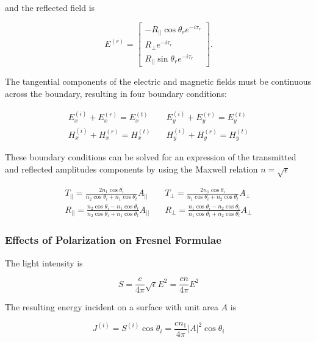 and the reflected field is

\begin{equation}
    E^{(r)} = 
    \begin{bmatrix}
        -R_{||} \cos{\theta_r} e^{-i \tau_r} \\
        R_\perp e^{-i \tau_r} \\
        R_{||} \sin{\theta_r} e^{-i \tau_r}
    \end{bmatrix}.
\end{equation}

The tangential components of the electric and magnetic fields must be continuous across the boundary, resulting in four boundary conditions:

\begin{align}
    E^{(i)}_x + E^{(r)}_x = E^{(t)}_x \quad & E^{(i)}_y + E^{(r)}_y = E^{(t)}_y \\
    H^{(i)}_x + H^{(r)}_x = H^{(t)}_x \quad & H^{(i)}_y + H^{(r)}_y = H^{(t)}_y
\end{align}

These boundary conditions can be solved for an expression of the transmitted and reflected amplitudes components by using the Maxwell relation $n = \sqrt{\epsilon}$

\begin{align}
    T_{||} = \frac{2 n_1 \cos{\theta_i}}{n_2 \cos{\theta_i} + n_1 \cos{\theta_t}} A_{||} \quad &
    T_{\perp} = \frac{2 n_1 \cos{\theta_i}}{n_1 \cos{\theta_i} + n_2 \cos{\theta_t}} A_{\perp} \\
    R_{||} = \frac{n_2 \cos{\theta_i} - n_1 \cos{\theta_t}}{n_2 \cos{\theta_i} + n_1 \cos{\theta_t}} A_{||} \quad &
    R_{\perp} = \frac{n_1 \cos{\theta_i} - n_2 \cos{\theta_t}}{n_1 \cos{\theta_i} + n_2 \cos{\theta_t}} A_{\perp}
\end{align}

\subsubsection{Effects of Polarization on Fresnel Formulae}
The light intensity is

\begin{equation}
    S = \frac{c}{4\pi} \sqrt{\epsilon} E^2 = \frac{cn}{4\pi} E^2
\end{equation}

The resulting energy incident on a surface with unit area $A$ is

\begin{equation}
    J^{(i)} = S^{(i)} \cos{\theta_i} = \frac{cn_1}{4\pi} |A|^2 \cos{\theta_i}
\end{equation}

